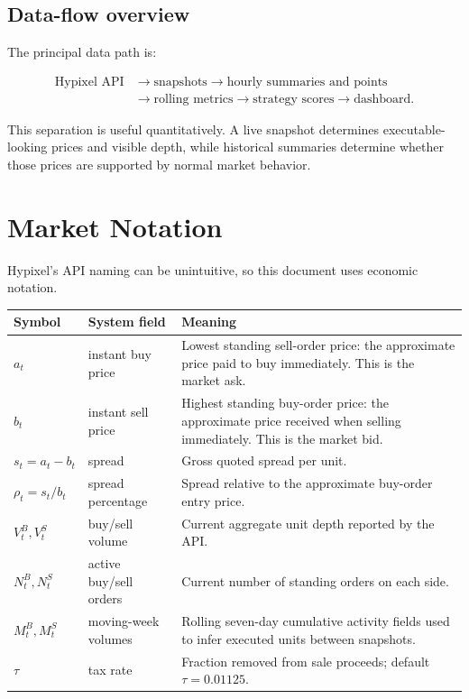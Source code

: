 \documentclass[11pt,a4paper]{article}
\begin{document}
\subsection{Data-flow overview}

The principal data path is:

\begin{align*}
\text{Hypixel API}&\longrightarrow \text{snapshots}
\longrightarrow \text{hourly summaries and points}\\
&\longrightarrow \text{rolling metrics}
\longrightarrow \text{strategy scores}
\longrightarrow \text{dashboard}.
\end{align*}

This separation is useful quantitatively. A live snapshot determines executable-looking
prices and visible depth, while historical summaries determine whether those prices are
supported by normal market behavior.

\section{Market Notation}

Hypixel's API naming can be unintuitive, so this document uses economic notation.

\begin{longtable}{p{}p{}p{}}
\toprule
Symbol & System field & Meaning\\
\midrule
\endhead
$a_t$ & instant buy price & Lowest standing sell-order price: the approximate price paid
to buy immediately. This is the market ask.\\
$b_t$ & instant sell price & Highest standing buy-order price: the approximate price received
when selling immediately. This is the market bid.\\
$s_t=a_t-b_t$ & spread & Gross quoted spread per unit.\\
$\rho_t=s_t/b_t$ & spread percentage & Spread relative to the approximate buy-order entry price.\\
$V_t^B,V_t^S$ & buy/sell volume & Current aggregate unit depth reported by the API.\\
$N_t^B,N_t^S$ & active buy/sell orders & Current number of standing orders on each side.\\
$M_t^B,M_t^S$ & moving-week volumes & Rolling seven-day cumulative activity fields used to
infer executed units between snapshots.\\
$\tau$ & tax rate & Fraction removed from sale proceeds; default $\tau=0.01125$.\\
\bottomrule
\end{longtable}
\end{document}
